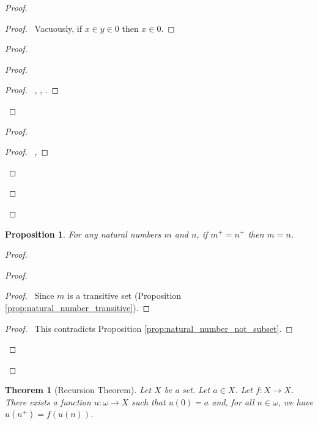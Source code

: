 \documentclass{report}
\let\qed\relax
\newtheorem{prop}[ax]{Proposition}
\newtheorem{thm}[ax]{Theorem}
\theoremstyle{definition}
\begin{document}
\begin{proof}
\pf
{}
\begin{proof}
	\pf\ Vacuously, if $x \in y \in 0$ then $x \in 0$.
\end{proof}
\begin{proof}
	\begin{proof}
		\begin{proof}
			\pf\ , , .
		\end{proof}
	\end{proof}
	\begin{proof}
		\begin{proof}
			\pf\ , 
		\end{proof}
	\end{proof}
\end{proof}
\qed
\end{proof}

\begin{prop}
For any natural numbers $m$ and $n$, if $m^+ = n^+$ then $m = n$.
\end{prop}

\begin{proof}
\pf
{}
\begin{proof}
	\begin{proof}
		\pf\ Since $m$ is a transitive set (Proposition \ref{prop:natural_number_transitive}).
	\end{proof}
	\qedstep
	\begin{proof}
		\pf\ This contradicts Proposition \ref{prop:natural_number_not_subset}.
	\end{proof}
\end{proof}
\qed
\end{proof}

\begin{thm}[Recursion Theorem]
Let $X$ be a set. Let $a \in X$. Let $f : X \rightarrow X$. There exists a function $u : \omega \rightarrow X$ such that $u(0) = a$ and, for all $n \in \omega$, we have $u(n^+) = f(u(n))$.
\end{thm}
\end{document}
